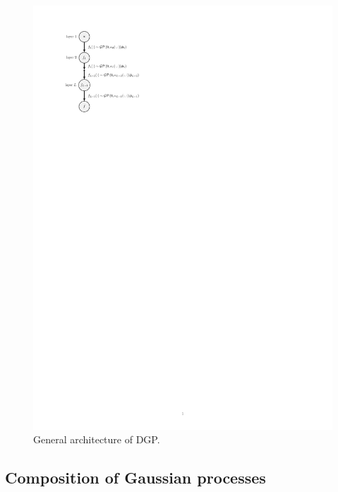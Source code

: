 \documentclass[iicol,sn-basic]{sn-jnl}%
\begin{document}
\begin{figure}
	\centering
	\includegraphics[scale=0.8]{Fig6.pdf}
	\caption{General architecture of DGP.}
	\label{Fig-6}
\end{figure}

\subsection{Composition of Gaussian processes}\label{Sec45}
\end{document}
